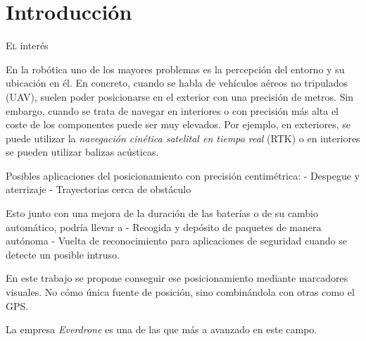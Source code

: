 \chapter{Introducción}\label{chp-02}

\lettrine[lraise=-0.1, lines=2, loversize=0.2]{E}{l} interés 

En la robótica uno de los mayores problemas es la percepción del entorno y su ubicación en él. En concreto, cuando se habla de vehículos aéreos no tripulados (UAV), suelen poder posicionarse en el exterior con una precisión de metros. Sin embargo, cuando se trata de navegar en interiores o con precisión más alta el coste de los componentes puede ser muy elevados. Por ejemplo, en exteriores, se puede utilizar la \textit{navegación cinética satelital en tiempo real} (RTK) o en interiores se pueden utilizar balizas acústicas.



Posibles aplicaciones del posicionamiento con precisión centimétrica:
- Despegue y aterrizaje
- Trayectorias cerca de obstáculo

Esto junto con una mejora de la duración de las baterías o de su cambio automático, podría llevar a
- Recogida y depósito de paquetes de manera autónoma
- Vuelta de reconocimiento para aplicaciones de seguridad cuando se detecte un posible intruso.


En este trabajo se propone conseguir ese posicionamiento mediante marcadores visuales. No cómo única fuente de posición, sino combinándola con otras como el GPS.



La empresa \textit{Everdrone} es una de las que más a avanzado en este campo. 


\endinput
